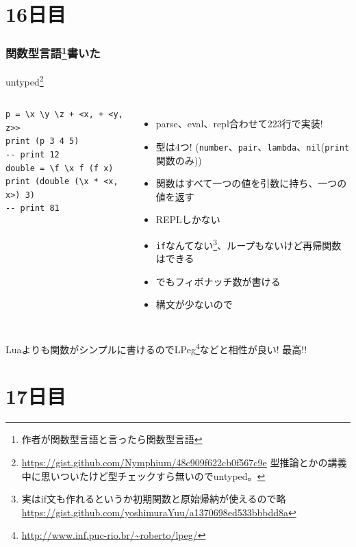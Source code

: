 \section{16日目}
\begin{frame}[fragile]
	\frametitle{関数型言語\footnote[frame]{作者が関数型言語と言ったら関数型言語}書いた}


	\alert{\LARGE{}untyped}\footnote[frame]{\url{https://gist.github.com/Nymphium/48c909f622cb0f567c9e} 型推論とかの講義中に思いついたけど型チェックすら無いのでuntyped。}
	\begin{columns}
		\column[t]{.4\hsize}
		\scriptsize
		\begin{lstlisting}[numbers=none,language=untyped]
p = \x \y \z + <x, + <y, z>>
print (p 3 4 5)
-- print 12
double = \f \x f (f x)
print (double (\x * <x, x>) 3)
-- print 81
		\end{lstlisting}

		\column[t]{.7\hsize}
		\begin{itemize}
			\item parse、eval、repl合わせて223行で実装!
			\item 型は4つ! {\footnotesize{}(\lstinline|number|、\lstinline|pair|、\lstinline|lambda|、\lstinline|nil|{\footnotesize{}(\lstinline|print|関数のみ)})}
			\item 関数はすべて一つの値を引数に持ち、一つの値を返す
			\item REPLしかない
			\item \lstinline|if|なんてない\footnote[frame]{実はif文も作れるというか初期関数と原始帰納が使えるので略\url{https://gist.github.com/yoshimuraYuu/a1370698ed533bbbdd8a}}、ループもないけど再帰関数はできる
			\item でもフィボナッチ数が書ける\footnotemark[17]
			\item 構文が少ないので
		\end{itemize}
	\end{columns}
\vspace{1\zw}

Luaよりも関数がシンプルに書けるのでLPeg\footnote[frame]{\url{http://www.inf.puc-rio.br/~roberto/lpeg/}}などと相性が良い! 最高!!
\end{frame}
\section{17日目}
